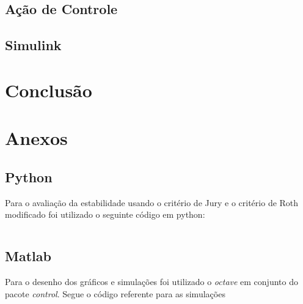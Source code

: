 \documentclass[a4paper,11pt]{article}
\begin{document}
\subsection{Ação de Controle}
\subsection{Simulink}
\subsection{}

\section{Conclusão}


\nocite{sympy}



\section{Anexos}
\subsection{Python}

Para o avaliação da estabilidade usando o critério de Jury e o critério de Roth modificado foi utilizado o seguinte código em python:

\inputminted[xleftmargin=15pt,linenos,frame=single,framesep=5pt]{python}{../python/exsim2.py}

\subsection{Matlab}

Para o desenho dos gráficos e simulações foi utilizado o \textit{octave} em conjunto do pacote \textit{control}. Segue o código referente para as simulações



\end{document}
